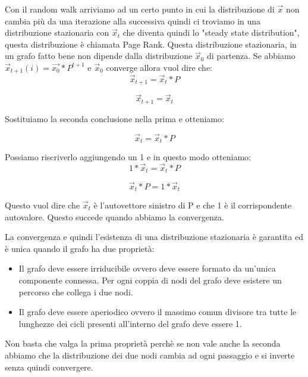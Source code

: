 \documentclass[14pt]{extreport}
\begin{document}
Con il random walk arriviamo ad un certo punto in cui la distribuzione di $\vec{x}$ non cambia più da una iterazione alla successiva quindi ci troviamo in una distribuzione stazionaria con $\vec{x}_t$ che diventa quindi lo "steady state distribution", questa distribuzione è chiamata Page Rank.
Questa distribuzione stazionaria, in un grafo fatto bene non dipende dalla distribuzione $\vec{x}_0$ di partenza.
Se abbiamo {$\vec{x}_{t+1}(i) = \vec{x_0}*P^{t+1}$} e $\vec{x}_0$ converge allora vuol dire che:
\begin{equation}
    \vec{x}_{t+1} = \vec{x}_t * P
\end{equation}

\begin{equation}
    \vec{x}_{t+1} = \vec{x}_t
\end{equation}

Sostituiamo la seconda conclusione nella prima e otteniamo:

\begin{equation}
    \vec{x}_{t} = \vec{x}_t * P
\end{equation}

Possiamo riscriverlo aggiungendo un 1 e in questo modo otteniamo:
\begin{equation}
    1 * \vec{x}_{t} = \vec{x}_t * P 
\end{equation}

\begin{equation}
    \vec{x}_t * P = 1 * \vec{x}_{t} 
\end{equation}

Questo vuol dire che $\vec{x}_t$ è l'autovettore sinistro di P e che 1 è il corrispondente autovalore.
Questo succede quando abbiamo la convergenza.

La convergenza e quindi l'esistenza di una distribuzione stazionaria è garantita ed è unica quando il grafo ha due proprietà:
\begin{itemize}
    \item Il grafo deve essere irriducibile ovvero deve essere formato da un'unica componente connessa. Per ogni coppia di nodi del grafo deve esistere un percorso che collega i due nodi.
    \item Il grafo deve essere aperiodico ovvero il massimo comun divisore tra tutte le lunghezze dei cicli presenti all'interno del grafo deve essere 1.
\end{itemize}

Non basta che valga la prima proprietà perchè se non vale anche la seconda abbiamo che la distribuzione dei due nodi cambia ad ogni passaggio e si inverte senza quindi convergere.
\end{document}

